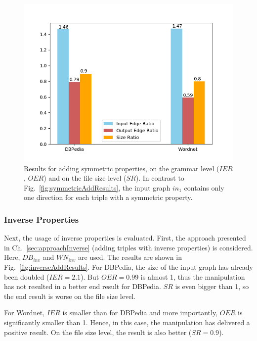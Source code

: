 \begin{figure}
	\centering
	\includegraphics[width=0.8\linewidth]{figures/4_evaluation/ontology/ratiosSymmetricsAdd2}
	\caption{Results for adding symmetric properties, on the grammar level ($IER$, $OER$) and on the file size level ($SR$). In contrast to Fig.~\ref{fig:symmetricAddResults}, the input graph $in_1$ contains only one direction for each triple with a symmetric property.}
	\label{fig:symmetricAddResults2}
\end{figure}



\subsubsection{Inverse Properties}

Next, the usage of inverse properties is evaluated. First, the approach presented in Ch.~\ref{sec:approachInverse} (adding triples with inverse properties) is considered. Here, $DB_{inv}$ and $WN_{inv}$ are used. The results are shown in Fig.~\ref{fig:inverseAddResults}. For DBPedia, the size of the input graph has already been doubled ($IER=2.1$). But $OER=0.99$ is almost 1, thus the manipulation has not resulted in a better end result for DBPedia. $SR$ is even bigger than 1, so the end result is worse on the file size level.

For Wordnet, $IER$ is smaller than for DBPedia and more importantly, $OER$ is significantly smaller than 1. Hence, in this case, the manipulation has delivered a positive result. On the file size level, the result is also better ($SR=0.9$).

